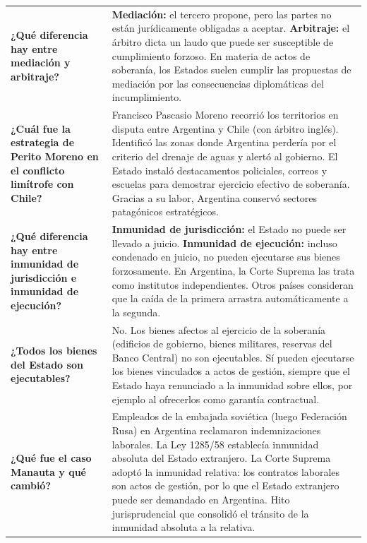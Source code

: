 \documentclass[12pt,oneside]{book}
\begin{document}
\begin{table}[H]
\begin{tabularx}{\textwidth}{
    >{\raggedright\arraybackslash}p{}
    >{\raggedright\arraybackslash}X
}
\addlinespace

\textbf{¿Qué diferencia hay entre mediación y arbitraje?} &
\textbf{Mediación:} el tercero propone, pero las partes no están jurídicamente obligadas a aceptar. \textbf{Arbitraje:} el árbitro dicta un laudo que puede ser susceptible de cumplimiento forzoso. En materia de actos de soberanía, los Estados suelen cumplir las propuestas de mediación por las consecuencias diplomáticas del incumplimiento. \\

\addlinespace

\textbf{¿Cuál fue la estrategia de Perito Moreno en el conflicto limítrofe con Chile?} &
Francisco Pascasio Moreno recorrió los territorios en disputa entre Argentina y Chile (con árbitro inglés). Identificó las zonas donde Argentina perdería por el criterio del drenaje de aguas y alertó al gobierno. El Estado instaló destacamentos policiales, correos y escuelas para demostrar ejercicio efectivo de soberanía. Gracias a su labor, Argentina conservó sectores patagónicos estratégicos. \\

\addlinespace

\textbf{¿Qué diferencia hay entre inmunidad de jurisdicción e inmunidad de ejecución?} &
\textbf{Inmunidad de jurisdicción:} el Estado no puede ser llevado a juicio. \textbf{Inmunidad de ejecución:} incluso condenado en juicio, no pueden ejecutarse sus bienes forzosamente. En Argentina, la Corte Suprema las trata como institutos independientes. Otros países consideran que la caída de la primera arrastra automáticamente a la segunda. \\

\addlinespace

\textbf{¿Todos los bienes del Estado son ejecutables?} &
No. Los bienes afectos al ejercicio de la soberanía (edificios de gobierno, bienes militares, reservas del Banco Central) no son ejecutables. Sí pueden ejecutarse los bienes vinculados a actos de gestión, siempre que el Estado haya renunciado a la inmunidad sobre ellos, por ejemplo al ofrecerlos como garantía contractual. \\

\addlinespace

\textbf{¿Qué fue el caso Manauta y qué cambió?} &
Empleados de la embajada soviética (luego Federación Rusa) en Argentina reclamaron indemnizaciones laborales. La Ley 1285/58 establecía inmunidad absoluta del Estado extranjero. La Corte Suprema adoptó la inmunidad relativa: los contratos laborales son actos de gestión, por lo que el Estado extranjero puede ser demandado en Argentina. Hito jurisprudencial que consolidó el tránsito de la inmunidad absoluta a la relativa. \\


\end{tabularx}
\end{table}
\end{document}
